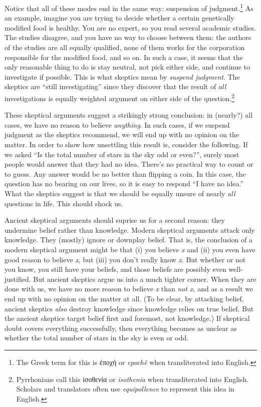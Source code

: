 Notice that all of these modes end in the same way: suspension of judgment.\footnote{The Greek term for this is \textgreek{ἐποχή} or \textit{epochê} when transliterated into English.} As an example, imagine you are trying to decide whether a certain genetically modified food is healthy. You are no expert, so you read several academic studies. The studies disagree, and you have no way to choose between them: the authors of the studies are all equally qualified, none of them works for the corporation responsible for the modified food, and so on. In such a case, it seems that the only reasonable thing to do is stay neutral, not pick either side, and continue to investigate if possible. This is what skeptics mean by \textit{suspend judgment}. The skeptics are ``still investigating'' since they discover that the result of \textit{all} investigations is equally weighted argument on either side of the question.\footnote{Pyrrhonians call this \textgreek{ἰσοθενία} or \textit{isothenia} when transliterated into English. Scholars and translators often use \textit{equipollence} to represent this idea in English.}

These skeptical arguments suggest a strikingly strong conclusion: in (nearly?) all cases, we have no reason to believe \textit{anything}. In such cases, if we suspend judgment as the skeptics recommend, we will end up with no opinion on the matter. In order to show how unsettling this result is, consider the following. If we asked ``Is the total number of stars in the sky odd or even?'', surely most people would answer that they had no idea. There's no practical way to count or to guess. Any answer would be no better than flipping a coin. In this case, the question has no bearing on our lives, so it is easy to respond ``I have no idea.'' What the skeptics suggest is that we should be equally unsure of nearly \textit{all} questions in life. This should shock us.

Ancient skeptical arguments should suprise us for a second reason: they undermine belief rather than knowledge. Modern skeptical arguments attack  only knowledge. They (mostly) ignore or downplay belief. That is, the conclusion of a modern skeptical argument might be that (i) you believe \textit{x} and (ii) you even have good reason to believe \textit{x}, but (iii) you don't really know \textit{x}. But whether or not you know, you still have your beliefs, and those beliefs are possibly even well-justified. But ancient skeptics argue us into a much tighter corner. When they are done with us, we have no more reason to believe \textit{x} than \textit{not x}, and as a result we end up with no opinion on the matter at all. (To be clear, by attacking belief, ancient skeptics \textit{also} destroy knowledge since knowledge relies on true belief. But the ancient skeptics target belief first and foremost, not knowledge.) If skeptical doubt covers everything successfully, then everything becomes as unclear as whether the total number of stars in the sky is even or odd.

